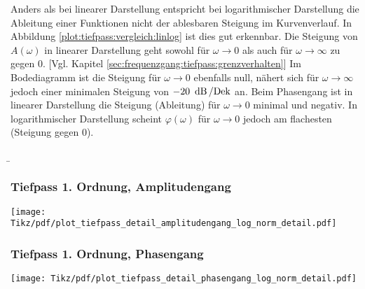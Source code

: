 \begin{frame}
{    %
    Anders als bei linearer Darstellung entspricht bei logarithmischer Darstellung 
    die Ableitung einer Funktionen nicht der ablesbaren Steigung im Kurvenverlauf.
    In Abbildung \ref{plot:tiefpass:vergleich:linlog} ist dies gut erkennbar. 
    Die Steigung von $A(\omega)$ in linearer Darstellung geht sowohl
    für $\omega \to 0$ als auch für $\omega \to \infty$ zu gegen $0$. [Vgl. Kapitel \ref{sec:frequenzgang:tiefpass:grenzverhalten}]
    Im Bodediagramm ist die Steigung für $\omega \to 0$ ebenfalls null, nähert sich für $\omega \to \infty$ 
    jedoch einer minimalen Steigung von $-20\ \dB/\mathrm{Dek}$ an. 
    Beim Phasengang ist in linearer Darstellung die Steigung (Ableitung) für $\omega \to 0$ minimal und negativ.
    In logarithmischer Darstellung scheint $\varphi(\omega)$ für $\omega \to 0$ jedoch am flachesten (Steigung gegen $0$).
}
\end{frame}

\b{%
\subsubsection{Tiefpass 1. Ordnung, Amplitudengang}
\begin{frame}\ftx{\subsubsecname}\centering
    \texttt{[image: Tikz/pdf/plot\_tiefpass\_detail\_amplitudengang\_log\_norm\_detail.pdf]}
\end{frame}
\subsubsection{Tiefpass 1. Ordnung, Phasengang}
\begin{frame}\ftx{\subsubsecname}\centering
    \texttt{[image: Tikz/pdf/plot\_tiefpass\_detail\_phasengang\_log\_norm\_detail.pdf]}
\end{frame}
}


